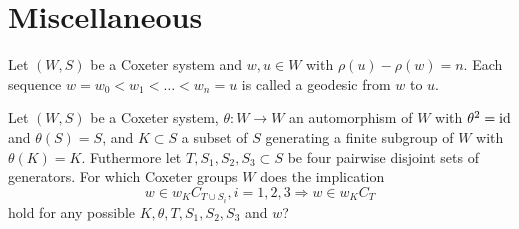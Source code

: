 \section{Miscellaneous}

\begin{defi}[Geodesic]
	Let $(W,S)$ be a Coxeter system and $w,u \in W$ with $\rho(u) - \rho(w) = n$.
	Each sequence $w = w_0 < w_1 < \ldots < w_n = u$ is called a geodesic
	from $w$ to $u$.
\end{defi}

\begin{ques}
	\label{main}
	Let $(W,S)$ be a Coxeter system, $\theta : W \to W$ an automorphism of $W$ with
	$\theta^2 = \operatorname{id}$ and $\theta(S) = S$, and $K \subset S$ a subset of $S$ generating
	a finite subgroup of $W$ with $\theta(K) = K$. Futhermore let $T,S_1,S_2,S_3 \subset
	S$ be four pairwise disjoint sets of generators. For which Coxeter groups $W$ does
	the implication
	\begin{equation}
	\label{main}
	w \in w_K C_{T \cup S_i}, i=1,2,3 \Rightarrow w \in w_K C_T
	\end{equation}
	hold for any possible $K,\theta,T,S_1,S_2,S_3$ and $w$?
\end{ques}

